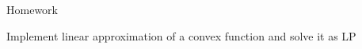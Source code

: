 \documentclass{beamer}
\begin{document}
\begin{frame}{Homework}
\begin{flushleft}

Implement linear approximation of a convex function and solve it as LP

\end{flushleft}
\end{frame}




\myqrframe
\end{document}

